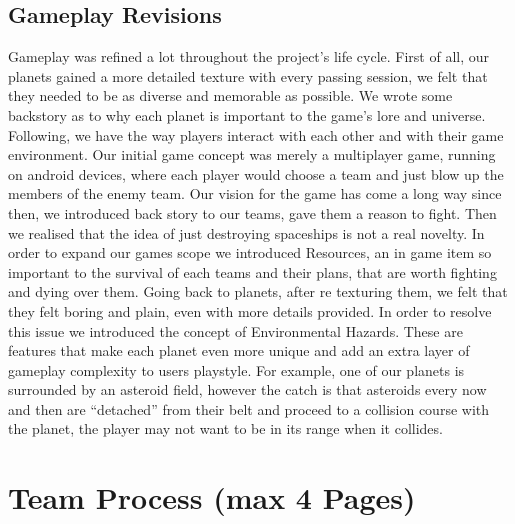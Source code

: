 \documentclass[11pt,a4paper]{article}
\begin{document}
        \subsection{Gameplay Revisions}
        Gameplay was refined a lot throughout the project's life cycle. 
        First of all, our planets gained a more detailed texture with every passing session, we felt that they needed to be as diverse and memorable as possible. We wrote some backstory as to why each planet is important to the game's lore and universe. 
        Following, we have the way players interact with each other and with their game environment. Our initial game concept was merely a multiplayer game, running on android devices, where each player would choose a team and just blow up the members of the enemy team. Our vision for the game has come a long way since then, we introduced back story to our teams, gave them a reason to fight. Then we realised that the idea of just destroying spaceships is not a real novelty. In order to expand our games scope we introduced Resources, an in game item so important to the survival of each teams and their plans, that are worth fighting and dying over them. 
        Going back to planets, after re texturing them, we felt that they felt boring and plain, even with more details provided. In order to resolve this issue we introduced the concept of Environmental Hazards. These are features that make each planet even more unique and add an extra layer of gameplay complexity to users playstyle. For example, one of our planets is surrounded by an asteroid field, however the catch is that asteroids every now and then are “detached” from their belt and proceed to a collision course with the planet, the player may not want to be in its range when it collides.

        \section{Team Process (max 4 Pages)}
        
\end{document}
